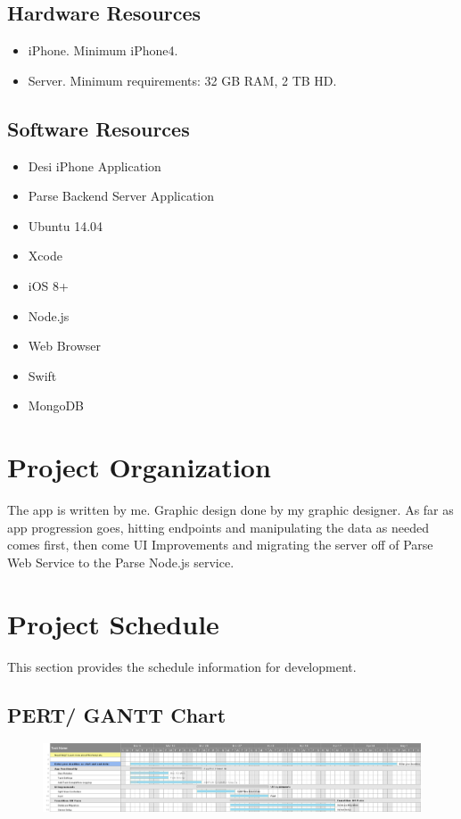 \documentclass[11pt, a4paper]{report}
\begin{document}
\subsection{Hardware Resources}
\begin{itemize}
\item iPhone. Minimum iPhone4.
\item Server. Minimum requirements: 32 GB RAM, 2 TB HD.
\end{itemize}

\subsection{Software Resources}
\begin{itemize}
\item Desi iPhone Application
\item Parse Backend Server Application
\item Ubuntu 14.04
\item Xcode
\item iOS 8+
\item Node.js
\item Web Browser
\item Swift
\item MongoDB
\end{itemize}

\section{Project Organization}
The app is written by me. Graphic design done by my graphic designer. As far as app progression goes, hitting endpoints and manipulating the data as needed comes first, then come UI Improvements and migrating the server off of Parse Web Service to the Parse Node.js service.
\section{Project Schedule}
This section provides the schedule information for development.
\subsection{PERT/ GANTT Chart}
\begin{figure}[H]
\centering
\includegraphics[width=1.0\textwidth]{DesiGantt.png}
\end{figure}
\end{document}
